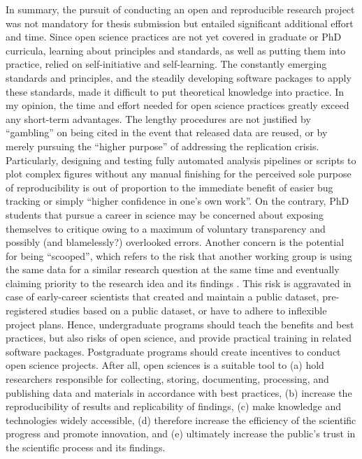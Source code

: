 %
In summary, the pursuit of conducting an open and reproducible research project
was not mandatory for thesis submission but entailed significant additional
effort and time.
%
Since open science practices are not yet covered in graduate or PhD curricula,
learning about principles and standards, as well as putting them into practice,
relied on self-initiative and self-learning.
%
The constantly emerging standards and principles, and the steadily developing
software packages to apply these standards, made it difficult to put theoretical
knowledge into practice.
%
In my opinion, the time and effort needed for open science practices greatly
exceed any short-term advantages.
%
The lengthy procedures are not justified by ``gambling'' on being cited in the
event that released data are reused, or by merely pursuing the ``higher
purpose'' of addressing the replication crisis.
%
Particularly, designing and testing fully automated analysis pipelines or
scripts to plot complex figures without any manual finishing for the perceived
sole purpose of reproducibility is out of proportion to the immediate benefit of
easier bug tracking or simply ``higher confidence in one's own work''.
%
On the contrary, PhD students that pursue a career in science may be concerned
about exposing themselves to critique owing to a maximum of voluntary
transparency and possibly (and blamelessly?) overlooked errors.
%
Another concern is the potential for being ``scooped'', which refers to the risk
that another working group is using the same data for a similar research
question at the same time and eventually claiming priority to the research idea
and its findings \citep[cf.][]{laine2017afraid}.
%
This risk is aggravated in case of early-career scientists that created and
maintain a public dataset, pre-registered studies based on a public dataset, or
have to adhere to inflexible project plans.
%
Hence, undergraduate programs should teach the benefits and best practices, but
also risks of open science, and provide practical training in related software
packages.
%
Postgraduate programs should create incentives to conduct open science projects.
%
After all, open sciences is a suitable tool to
%
(a) hold researchers responsible for collecting, storing, documenting,
processing, and publishing data and materials in accordance with best practices,
%
(b) increase the reproducibility of results and replicability of findings,
%
(c) make knowledge and technologies widely accessible,
%
(d) therefore increase the efficiency of the scientific progress and promote
innovation, and
%
(e) ultimately increase the public's trust in the scientific process and its
findings.


